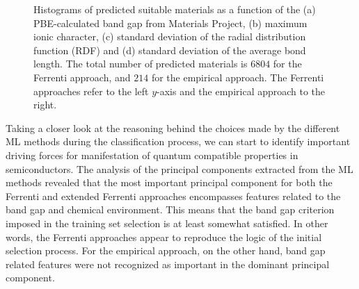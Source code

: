 \documentclass[superscriptaddress,unsortedaddress,
 amsmath,amssymb,
 aps,
]{revtex4-2}
\begin{document}
\begin{figure}[ht]
    \begin{subfigure}[b]{1\textwidth}
    \centering
    
  \end{subfigure}
  \par\bigskip
\begin{subfigure}[b]{0.45\textwidth}
    
    \subcaption{}
\end{subfigure}
\begin{subfigure}[b]{0.45\textwidth}
    
    \subcaption{}
\end{subfigure}%

\begin{subfigure}[b]{0.45\textwidth}
    
    \subcaption{}
\end{subfigure}
\begin{subfigure}[b]{0.45\textwidth}
    
    \subcaption{}
\end{subfigure}
\caption{Histograms of predicted suitable materials as a function of the (a) PBE-calculated band gap from Materials Project, (b) maximum ionic character, (c) standard deviation of the radial distribution function (RDF) and (d) standard deviation of the average bond length. The total number of predicted materials is  $6804$ for the Ferrenti approach, and $214$ for the empirical approach. The Ferrenti approaches refer to the left $y$-axis and the empirical approach to the right.
    }
\label{fig:histogram_new}
\end{figure}

Taking a closer look at the reasoning behind the choices made by the different ML methods during the classification process, we can start to identify important driving forces for manifestation of quantum compatible properties in semiconductors. 
The analysis of the principal components extracted from the ML methods revealed that the most important principal component for both the Ferrenti and extended Ferrenti approaches encompasses features related to the band gap and chemical environment. This means that the band gap criterion imposed in the training set selection is at least somewhat satisfied. In other words, the Ferrenti approaches appear to reproduce the logic of the initial selection process. For the empirical approach, on the other hand, band gap related features were not recognized as important in the dominant principal component. 
\end{document}
